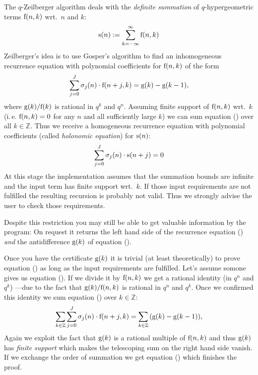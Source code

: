 The $q$-Zeilberger algorithm \cite{Koornwinder:93}
deals with the \textsl{definite summation} of
$q$-hyper\-geo\-metric terms ${\mathrm f}(n,k)$ wrt.\ $n$ and $k$:
\[
	{\mathrm s}(n):= \sum_{k=-\infty}^\infty{{\mathrm f}(n,k)}
\]
Zeilberger's idea is to use Gosper's algorithm to find an
inhomogeneous recurrence equation with polynomial coefficients
for ${\mathrm f}(n,k)$ of the form
\begin{equation} \label{eq:f_n_k-recursion}
	\sum_{j=0}^J{{\mathrm \sigma}_{j}(n)\cdot {\mathrm f}(n+j,k)} =
	{\mathrm g}(k)-{\mathrm g}(k-1),
\end{equation}
where ${\mathrm g}(k)/{\mathrm f}(k)$ is rational in $q^k$ and $q^n$.
Assuming finite support of ${\mathrm f}(n,k)$ wrt.\ $k$
(i.\,e. ${\mathrm f}(n,k)=0$ for any $n$ and all sufficiently large $k$)
we can sum equation () over all $k\in\mathbb{Z}$.
Thus we receive a homogeneous recurrence equation with polynomial
coefficients (called \textsl{holonomic equation}) for ${\mathrm s}(n)$:
\begin{equation} \label{holonomic_recurrence}
	\sum_{j=0}^J{{\mathrm \sigma}_{j}(n)\cdot {\mathrm s}(n+j)} = 0
\end{equation}
%
At this stage the implementation assumes that the summation
bounds are infinite and the input term has finite support wrt.\ $k$.
If those input requirements are not fulfilled the resulting
recursion is probably not valid. Thus we strongly advise the user to
check those requirements.

Despite this restriction you may still be able to get valuable
information by the program: On request it returns the
left hand side of the recurrence equation ()
\textsl{and} the antidifference ${\mathrm g}(k)$ of equation
().

Once you have the certificate ${\mathrm g}(k)$ it is trivial
(at least theoretically) to prove equation ()
as long as the input requirements are fulfilled. Let's assume
somone gives us equation (). If we divide
it by ${\mathrm f}(n,k)$ we get a rational identity (in $q^n$ and $q^k$)
---due to the fact that ${\mathrm g}(k)/{\mathrm f}(n,k)$ is rational in
$q^n$ and $q^k$. Once we confirmed this identity we sum equation
() over $k\in\mathbb{Z}$:
\begin{equation}
	\sum_{k\in\mathbb{Z}}\sum_{j=0}^J{{\mathrm \sigma}_{j}(n)\cdot {\mathrm f}(n+j,k)} =
	\sum_{k\in\mathbb{Z}}{\left({\mathrm g}(k)-{\mathrm g}(k-1)\right)},
\end{equation}
Again we exploit the
fact that ${\mathrm g}(k)$ is a rational multiple of ${\mathrm f}(n,k)$ and thus
${\mathrm g}(k)$ has \textsl{finite support} which makes the telescoping sum
on the right hand side vanish. If we exchange the order of summation we
get equation () which finishes the proof.


